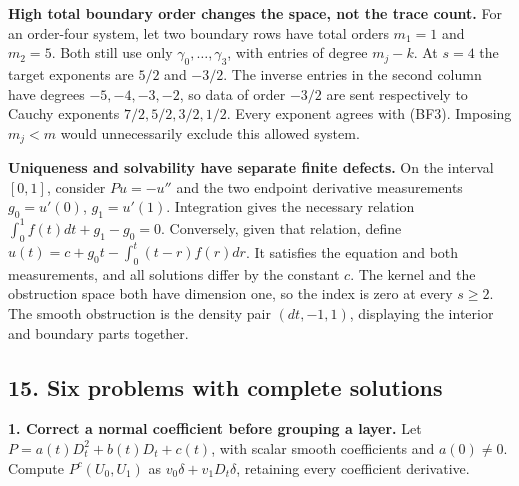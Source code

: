 \documentclass[
  11pt,
]{article}
\makeatletter
\let\ReaderOriginalAnchorStart\hyper@anchorstart
\let\ReaderOriginalAnchorEnd\hyper@anchorend
\let\ReaderPendingAliases\@empty
\def\ReaderArmAliases#1{\gdef\ReaderPendingAliases{#1}}
\def\hyper@anchorstart#1{\ReaderIfNativeAnchorTF{#1}{\ReaderPendingAliases\global\let\ReaderPendingAliases\@empty}{}\ReaderOriginalAnchorStart{#1}}
\makeatother
\begin{document}
\textbf{High total boundary order changes the space, not the trace
count.} For an order-four system, let two boundary rows have total
orders \(m_1=1\) and \(m_2=5\). Both still use only
\(\gamma_0,\ldots,\gamma_3\), with entries of degree \(m_j-k\). At
\(s=4\) the target exponents are \(5/2\) and \(-3/2\). The inverse
entries in the second column have degrees \(-5,-4,-3,-2\), so data of
order \(-3/2\) are sent respectively to Cauchy exponents
\(7/2,5/2,3/2,1/2\). Every exponent agrees with (BF3). Imposing
\(m_j<m\) would unnecessarily exclude this allowed system.

\textbf{Uniqueness and solvability have separate finite defects.} On the
interval \([0,1]\), consider \(Pu=-u''\) and the two endpoint derivative
measurements \(g_0=u'(0)\), \(g_1=u'(1)\). Integration gives the
necessary relation \(\int_0^1 f(t)dt+g_1-g_0=0\). Conversely, given that
relation, define \(u(t)=c+g_0t-\int_0^t(t-r)f(r)dr\). It satisfies the
equation and both measurements, and all solutions differ by the constant
\(c\). The kernel and the obstruction space both have dimension one, so
the index is zero at every \(s\geq2\). The smooth obstruction is the
density pair \((dt,-1,1)\), displaying the interior and boundary parts
together.

\ReaderArmAliases{\ReaderOriginalAnchorStart{AN03-GFB-PS-001}\ReaderOriginalAnchorEnd\begingroup\expandafter\def\csname @currentHref\endcsname{AN03-GFB-PS-001}\label{AN03-GFB-PS-001}\endgroup\ReaderOriginalAnchorStart{an03-gfb-ps-001-six-problems-with-complete-solutions}\ReaderOriginalAnchorEnd\begingroup\expandafter\def\csname @currentHref\endcsname{an03-gfb-ps-001-six-problems-with-complete-solutions}\label{an03-gfb-ps-001-six-problems-with-complete-solutions}\endgroup\ReaderOriginalAnchorStart{15-six-problems-with-complete-solutions}\ReaderOriginalAnchorEnd\begingroup\expandafter\def\csname @currentHref\endcsname{15-six-problems-with-complete-solutions}\label{15-six-problems-with-complete-solutions}\endgroup\ReaderOriginalAnchorStart{six-problems-with-complete-solutions}\ReaderOriginalAnchorEnd}
\subsection{15. Six problems with complete
solutions}\label{six-problems-with-complete-solutions}

\textbf{1. Correct a normal coefficient before grouping a layer.} Let
\(P=a(t)D_t^2+b(t)D_t+c(t)\), with scalar smooth coefficients and
\(a(0)\ne0\). Compute \(P^c(U_0,U_1)\) as \(v_0\delta+v_1D_t\delta\),
retaining every coefficient derivative.
\end{document}
